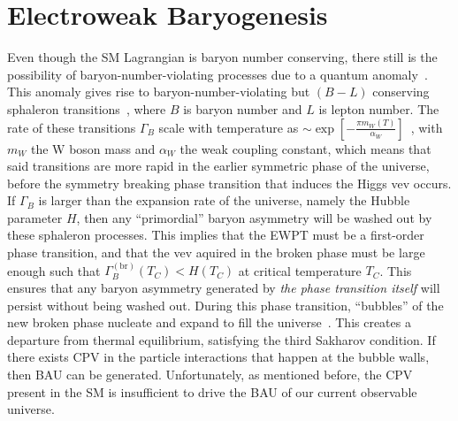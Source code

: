 \section{Electroweak Baryogenesis}\label{sec:EWBG}
Even though the SM Lagrangian is baryon number conserving, 
there still is the possibility of baryon-number-violating processes due to a quantum anomaly~\cite{tHooft1976BaryonNumAnomaly}.
This anomaly gives rise to baryon-number-violating but \((B-L) \) conserving sphaleron transitions~\cite{Klinkhamer1984Sphaleron}, where \(B \) is baryon number and \(L \) is lepton number.
The rate of these transitions \(\Gamma_{B} \) scale with temperature as \(\sim \exp\left[-\frac{\pi m_{W}(T)}{\alpha_{W}}\right] \)~\cite{Kuzmin1985EWBG},
with \(m_{W} \) the W boson mass and \(\alpha_{W} \) the weak coupling constant,
which means that said transitions are more rapid in the earlier symmetric phase of the universe,
before the symmetry breaking phase transition that induces the Higgs vev occurs.
If \(\Gamma_{B} \) is larger than the expansion rate of the universe, namely the Hubble parameter \(H \),
then any ``primordial'' baryon asymmetry will be washed out by these sphaleron processes.
This implies that the EWPT must be a first-order phase transition, 
and that the vev aquired in the broken phase must be large enough such that \(\Gamma_{B}^{(\mathrm{br})}(T_{C}) < H(T_{C})\) at critical temperature \(T_{C} \).
This ensures that any baryon asymmetry generated by \emph{the phase transition itself} will persist without being washed out.
During this phase transition, ``bubbles'' of the new broken phase nucleate and expand to fill the universe~\cite{Farrar1993MSMBAU}.
This creates a departure from thermal equilibrium, satisfying the third Sakharov condition.
If there exists CPV in the particle interactions that happen at the bubble walls,
then BAU can be generated.
Unfortunately, as mentioned before, the CPV present in the SM is insufficient to drive the BAU of our current observable universe.


